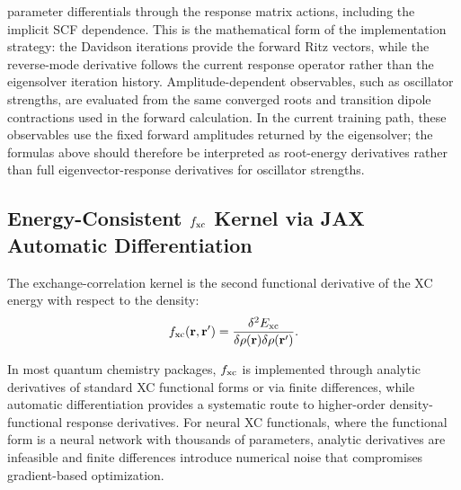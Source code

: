 parameter differentials through the response matrix actions, including
the implicit SCF dependence. This is the mathematical form of the
implementation strategy: the Davidson iterations provide the forward
Ritz vectors, while the reverse-mode derivative follows the current
response operator rather than the eigensolver iteration history.
Amplitude-dependent observables, such as oscillator strengths, are
evaluated from the same converged roots and transition dipole
contractions used in the forward calculation. In the current training
path, these observables use the fixed forward amplitudes returned by
the eigensolver; the formulas above should therefore be interpreted
as root-energy derivatives rather than full eigenvector-response
derivatives for oscillator strengths.

\subsection{Energy-Consistent \texorpdfstring{$f_{\rm xc}$}{fxc} Kernel via JAX Automatic Differentiation}
\label{sec:fxc}

The exchange-correlation kernel is the second functional derivative
of the XC energy with respect to the density:
\begin{equation}
  f_{\rm xc}(\mathbf{r}, \mathbf{r}') =
    \frac{\delta^2 E_{\rm xc}}
         {\delta\rho(\mathbf{r})\delta\rho(\mathbf{r}')}.
  \label{eq:fxcfd}
\end{equation}

In most quantum chemistry packages, $f_{\rm xc}$ is implemented
through analytic derivatives of standard XC functional forms
or via finite differences, while automatic differentiation provides
a systematic route to higher-order density-functional response
derivatives.\cite{Ekstrom2010ADResponse} For neural XC functionals, where the
functional form is a neural network with thousands of parameters,
analytic derivatives are infeasible and finite differences introduce
numerical noise that compromises gradient-based optimization.

